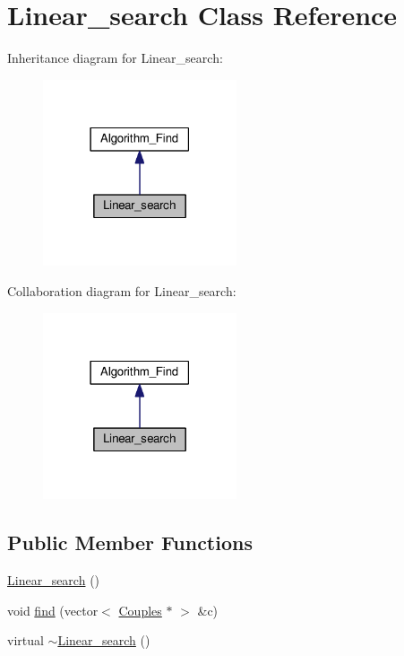 \hypertarget{class_linear__search}{\section{Linear\-\_\-search Class Reference}
\label{class_linear__search}
}


Inheritance diagram for Linear\-\_\-search\-:
\nopagebreak
\begin{figure}[H]
\begin{center}
\leavevmode
\includegraphics[width=162pt]{class_linear__search__inherit__graph}
\end{center}
\end{figure}


Collaboration diagram for Linear\-\_\-search\-:
\nopagebreak
\begin{figure}[H]
\begin{center}
\leavevmode
\includegraphics[width=162pt]{class_linear__search__coll__graph}
\end{center}
\end{figure}
\subsection*{Public Member Functions}
\begin{DoxyCompactItemize}
\item 
\hyperlink{class_linear__search_a327dab95617ec82af4aedd7b69d27e1f}{Linear\-\_\-search} ()
\item 
void \hyperlink{class_linear__search_a7c4f47cfdc8482d04fb162cf2316a466}{find} (vector$<$ \hyperlink{class_couples}{Couples} $\ast$ $>$ \&c)
\item 
virtual \hyperlink{class_linear__search_ad6b8a5e44574983929b389a0950a3eb6}{$\sim$\-Linear\-\_\-search} ()
\end{DoxyCompactItemize}


